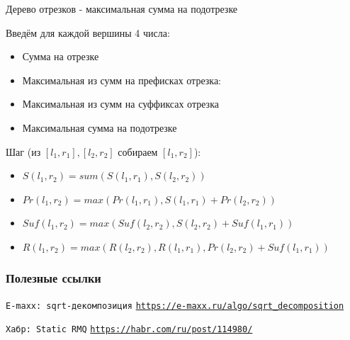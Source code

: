 \documentclass[10pt]{beamer}
\begin{document}
\begin{frame}[fragile]{Дерево отрезков - максимальная сумма на подотрезке}

Введём для каждой вершины 4 числа:\\
\begin{itemize}
    \item Сумма на отрезке
    \item Максимальная из сумм на префисках отрезка:
    \item Максимальная из сумм на суффиксах отрезка
    \item Максимальная сумма на подотрезке
\end{itemize}
Шаг (из $[l_1, r_1], [l_2, r_2]$ собираем $[l_1, r_2]$):
\begin{itemize}
    \item $S(l_1, r_2) = sum(S(l_1, r_1), S(l_2, r_2))$
    \item $Pr(l_1, r_2) = max(Pr(l_1, r_1), S(l_1, r_1) + Pr(l_2, r_2))$
    \item $Suf(l_1, r_2) = max(Suf(l_2, r_2), S(l_2, r_2) + Suf(l_1, r_1))$
    \item $R(l_1, r_2) = max(R(l_2, r_2), R(l_1, r_1), Pr(l_2, r_2) + Suf(l_1, r_1))$
\end{itemize}
\end{frame}


\appendix

\begin{frame}[allowframebreaks]
  \frametitle<presentation>{Полезные ссылки}
    
  \begin{thebibliography}{10}
{
  \beamertemplatebookbibitems

  \texttt{E-maxx: sqrt-декомпозиция}
  \newblock \href{https://e-maxx.ru/algo/sqrt_decomposition}
  {\texttt{https://e-maxx.ru/algo/sqrt_decomposition}}
 
  \texttt{Хабр: Static RMQ}
  \newblock \href{https://habr.com/ru/post/114980/}
  {\texttt{https://habr.com/ru/post/114980/}}
  
}
  \end{thebibliography}
  \end{frame}
\end{document}
